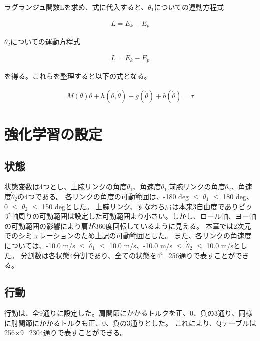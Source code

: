 ラグランジュ関数Lを求め、式に代入すると、$\theta_{1}$についての運動方程式

\begin{eqnarray}
  L
  =E_{k} - E_{p}
\end{eqnarray}

$\theta_{2}$についての運動方程式

\begin{eqnarray}
  L
  =E_{k} - E_{p}
\end{eqnarray}

を得る。これらを整理すると以下の式となる。

\begin{eqnarray}
  M(\theta)\ddot{\theta} + h(\theta, \dot{\theta}) + g(\dot{\theta}) + b(\dot{\theta}) = \tau
\end{eqnarray}


\section{強化学習の設定}
\subsection{状態}
状態変数は4つとし、上腕リンクの角度$\theta_{1}$、角速度$\dot{\theta}_{1}$,前腕リンクの角度$\theta_{2}$、角速度$\dot{\theta}_{2}$の4つである。
各リンクの角度の可動範囲は、-180 deg $\le$ $\theta_{1}$ $\le$ 180 deg、0 $\le$ $\theta_{2}$ $\le$ 150 degとした。
上腕リンク、すなわち肩は本来3自由度でありピッチ軸周りの可動範囲は設定した可動範囲より小さい。しかし、ロール軸、ヨー軸の可動範囲の影響により肩が360度回転しているように見える。
本章では2次元でのシミュレーションのため上記の可動範囲とした。
また、各リンクの角速度については、-10.0 m/s $\le$ $\dot{\theta}_{1}$ $\le$ 10.0 m/s、-10.0 m/s $\le$ $\dot{\theta}_{2}$ $\le$ 10.0 m/sとした。
分割数は各状態4分割であり、全ての状態を$4^{4}$=256通りで表すことができる。
\subsection{行動}
行動は、全9通りに設定した。肩関節にかかるトルクを正、0、負の3通り、同様に肘関節にかかるトルクも正、0、負の3通りとした。
これにより、Qテーブルは256$\times$9=2304通りで表すことができる。
